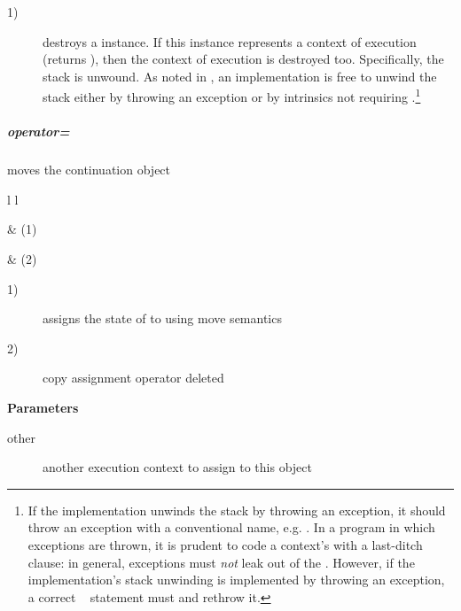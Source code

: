 \begin{description}
    \item[1)] destroys a \cont instance. If this instance represents a context
              of execution (\opbool returns ), then the context of
              execution is destroyed too. Specifically, the stack is unwound. As
              noted in , an implementation is free to
              unwind the stack either by throwing an exception or by
              intrinsics not requiring .\footnote{If the
              implementation unwinds the stack by throwing an exception, it
              should throw an exception with a conventional name,
              e.g. . In a program in which exceptions are
              thrown, it is prudent to code a context's \entryfn with a
              last-ditch  clause: in general, exceptions must
              \emph{not} leak out of the \entryfn. However, if the
              implementation's stack unwinding is implemented by throwing an
              exception, a correct \entryfn\  statement
              must  and rethrow it.}
\end{description}

\subparagraph*{operator=}
moves the continuation object\\

\begin{tabular}{ l l }
    \midrule

     & (1)\\

    \midrule

     & (2)\\

    \midrule
\end{tabular}

\begin{description}
    \item[1)] assigns the state of  to  using move semantics
    \item[2)] copy assignment operator deleted
\end{description}

{\bfseries Parameters}
\begin{description}
    \item[other]   another execution context to assign to this object\\
\end{description}

